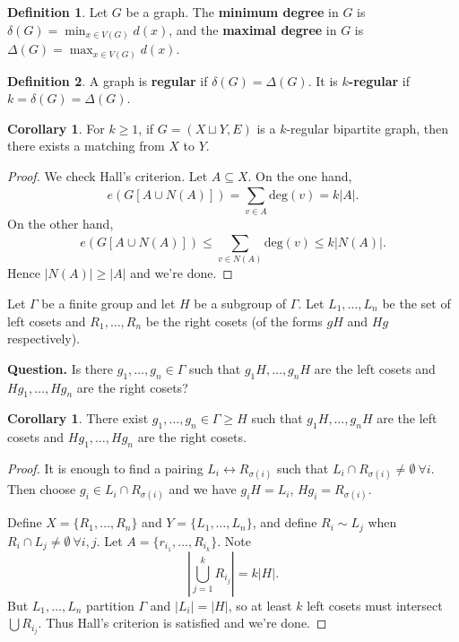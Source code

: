 \documentclass{article}
\theoremstyle{definition}
\newtheorem{cor}[theorem]{Corollary}
\newtheorem{defn}{Definition}[section]
\begin{document}
\begin{defn}
    Let $G$ be a graph. The \textbf{minimum degree} in $G$ is $\delta(G) = \min_{x \in V(G)} d(x)$, and the \textbf{maximal degree} in $G$ is $\Delta(G) = \max_{x \in V(G)} d(x)$. 
\end{defn}
\begin{defn}
    A graph is \textbf{regular} if $\delta(G)=\Delta(G)$. It is \textbf{$k$-regular} if $k=\delta(G)=\Delta(G)$.
\end{defn}


\begin{cor}
    For $k\ge 1$, if $G=(X \sqcup Y, E)$ is a $k$-regular bipartite graph, then there exists a matching from $X$ to $Y$.
\end{cor}
\begin{proof}
    We check Hall's criterion. Let $A \subseteq X$. On the one hand, $$e(G[A \cup N(A)]) = \sum_{v \in A}^{} \text{deg}(v) = k|A|.$$ On the other hand, $$e(G[A \cup N(A)]) \le  \sum_{v \in N(A)}^{} \text{deg}(v) \le k|N(A)|.$$
    Hence $|N(A)|\ge |A|$ and we're done.
\end{proof}

Let $\Gamma$ be a finite group and let $H$ be a subgroup of $\Gamma$. Let $L_1,\ldots,L_n$ be the set of left cosets and $R_1,\ldots,R_n$ be the right cosets (of the forms $gH$ and $Hg$ respectively).

\textbf{Question.} Is there $g_1,\ldots,g_n \in \Gamma$ such that $g_1H,\ldots,g_nH$ are the left cosets and $Hg_1,\ldots, Hg_n$ are the right cosets?
\begin{cor}
    There exist $g_1,\ldots,g_n \in \Gamma \ge H$ such that $g_1H,\ldots,g_nH$ are the left cosets and $Hg_1,\ldots,Hg_n$ are the right cosets.
\end{cor}
\begin{proof}
    It is enough to find a pairing $L_i \leftrightarrow R_{\sigma(i)}$ such that $L_i \cap R_{\sigma(i)} \neq \emptyset ~\forall i$. Then choose $g_i \in L_i \cap R_{\sigma(i)}$ and we have $g_i H =L_i$, $Hg_i = R_{\sigma(i)}$.
    \vspace{1mm}
    
    Define $X = \{R_1,\ldots,R_n\}$ and $Y=\{L_1,\ldots, L_n\}$, and define $R_i \sim L_j$ when $R_i \cap L_j \neq \emptyset ~\forall i,j$. Let $A = \{r_{i_1},\ldots,R_{i_k}\}$. Note
    \[
    \left|\bigcup_{j=1}^k R_{i_j}\right| = k|H|.
    \] 
    But $L_1,\ldots,L_n$ partition $\Gamma$ and $|L_i|=|H|$, so at least $k$ left cosets must intersect $\bigcup R_{i_j}$. Thus Hall's criterion is satisfied and we're done.
\end{proof}
\end{document}
